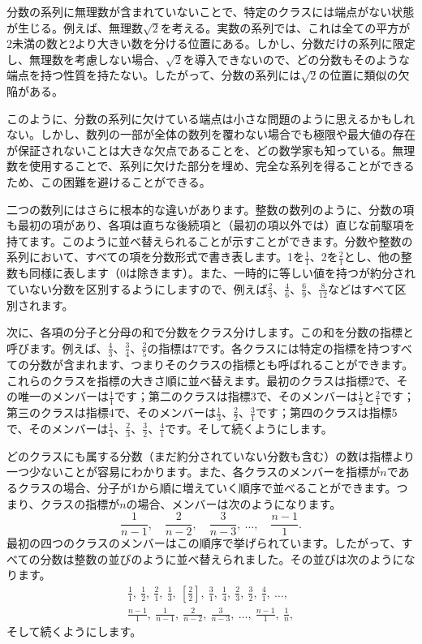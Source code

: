\documentclass[a4paper,11pt,openany]{ltjsbook}
\begin{document}
分数の系列に無理数が含まれていないことで、特定のクラスには端点がない状態が生じる。例えば、無理数$\sqrt{2}$を考える。実数の系列では、これは全ての平方が$2$未満の数と$2$より大きい数を分ける位置にある。しかし、分数だけの系列に限定し、無理数を考慮しない場合、$\sqrt{2}$を導入できないので、どの分数もそのような端点を持つ性質を持たない。したがって、分数の系列には$\sqrt{2}$の位置に類似の欠陥がある。

このように、分数の系列に欠けている端点は小さな問題のように思えるかもしれない。しかし、数列の一部が全体の数列を覆わない場合でも極限や最大値の存在が保証されないことは大きな欠点であることを、どの数学家も知っている。無理数を使用することで、系列に欠けた部分を埋め、完全な系列を得ることができるため、この困難を避けることができる。

二つの数列にはさらに根本的な違いがあります。整数の数列のように、分数の項も最初の項があり、各項は直ちな後続項と（最初の項以外では）直じな前駆項を持てます。このように並べ替えられることが示すことができます。分数や整数の系列において、すべての項を分数形式で書き表します。1を$\frac{1}{1}$、2を$\frac{2}{1}$とし、他の整数も同様に表します（0は除きます）。また、一時的に等しい値を持つが約分されていない分数を区別するようにしますので、例えば$\frac{2}{3}$、$\frac{4}{6}$、$\frac{6}{9}$、$\frac{8}{12}$などはすべて区別されます。

次に、各項の分子と分母の和で分数をクラス分けします。この和を分数の指標と呼びます。例えば、$\frac{4}{3}$、$\frac{3}{4}$、$\frac{2}{5}$の指標は7です。各クラスには特定の指標を持つすべての分数が含まれます、つまりそのクラスの指標とも呼ばれることができます。これらのクラスを指標の大きさ順に並べ替えます。最初のクラスは指標2で、その唯一のメンバーは$\frac{1}{1}$です；第二のクラスは指標3で、そのメンバーは$\frac{1}{2}$と$\frac{2}{1}$です；第三のクラスは指標4で、そのメンバーは$\frac{1}{3}$、$\frac{2}{2}$、$\frac{3}{1}$です；第四のクラスは指標5で、そのメンバーは$\frac{1}{4}$、$\frac{2}{3}$、$\frac{3}{2}$、$\frac{4}{1}$です。そして続くようにします。

どのクラスにも属する分数（まだ約分されていない分数も含む）の数は指標より一つ少ないことが容易にわかります。また、各クラスのメンバーを指標が$n$であるクラスの場合、分子が1から順に増えていく順序で並べることができます。つまり、クラスの指標が$n$の場合、メンバーは次のようになります。
\[
\frac{1}{n - 1},\quad
\frac{2}{n - 2},\quad
\frac{3}{n - 3},\
\dots,\quad
\frac{n - 1}{1}.
\]
最初の四つのクラスのメンバーはこの順序で挙げられています。したがって、すべての分数は整数の並びのように並べ替えられました。その並びは次のようになります。
\begin{gather*}
\frac{1}{1},\
\frac{1}{2},\
\frac{2}{1},\
\frac{1}{3},\
\left[\frac{2}{2}\right],\
\frac{3}{1},\
\frac{1}{4},\
\frac{2}{3},\
\frac{3}{2},\
\frac{4}{1},\  \dots, \\
\frac{n - 1}{1},\
\frac{1}{n - 1},\
\frac{2}{n - 2},\
\frac{3}{n - 3},\
\dots,\
\frac{n - 1}{1},\
\frac{1}{n},
\end{gather*}
そして続くようにします。
\end{document}
